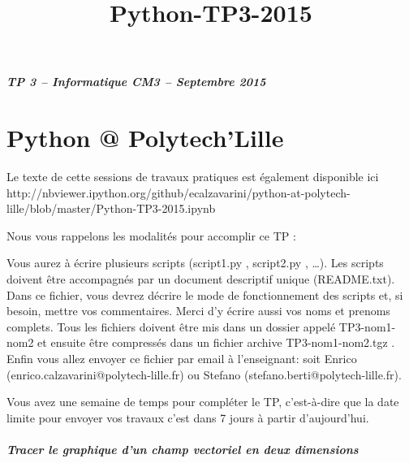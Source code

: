 \documentclass{article}
\title{Python-TP3-2015}
\begin{document}
    
    
    \maketitle
    
    

    

    \subparagraph{TP 3 -- Informatique CM3 -- Septembre 2015}



    \section{Python @ Polytech'Lille}


    Le texte de cette sessions de travaux pratiques est également disponible
ici
http://nbviewer.ipython.org/github/ecalzavarini/python-at-polytech-lille/blob/master/Python-TP3-2015.ipynb

    Nous vous rappelons les modalités pour accomplir ce TP :

Vous aurez à écrire plusieurs scripts (script1.py , script2.py ,
\ldots{}). Les scripts doivent être accompagnés par un document
descriptif unique (README.txt). Dans ce fichier, vous devrez décrire le
mode de fonctionnement des scripts et, si besoin, mettre vos
commentaires. Merci d'y écrire aussi vos noms et prenoms complets. Tous
les fichiers doivent être mis dans un dossier appelé TP3-nom1-nom2 et
ensuite être compressés dans un fichier archive TP3-nom1-nom2.tgz .
Enfin vous allez envoyer ce fichier par email à l'enseignant: soit
Enrico (enrico.calzavarini@polytech-lille.fr) ou Stefano
(stefano.berti@polytech-lille.fr).

Vous avez une semaine de temps pour compléter le TP, c'est-à-dire que la
date limite pour envoyer vos travaux c'est dans 7 jours à partir
d'aujourd'hui.


    \subparagraph{Tracer le graphique d'un champ vectoriel en deux dimensions}
\end{document}
